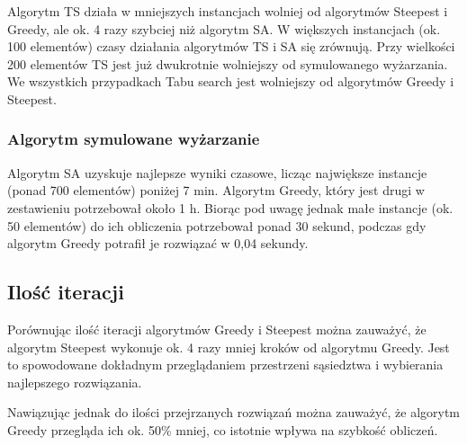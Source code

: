 Algorytm TS działa w mniejszych instancjach wolniej od algorytmów Steepest i Greedy, ale
ok. 4 razy szybciej niż algorytm SA. W większych instancjach (ok. 100 elementów) czasy 
działania algorytmów TS i SA się zrównują. Przy wielkości 200 elementów TS jest już 
dwukrotnie wolniejszy od symulowanego wyżarzania. We wszystkich przypadkach Tabu search 
jest wolniejszy od algorytmów Greedy i Steepest.

\subsubsection{Algorytm symulowane wyżarzanie}

Algorytm SA uzyskuje najlepsze wyniki czasowe, licząc największe instancje (ponad 700 
elementów) poniżej 7 min. Algorytm Greedy, który jest drugi w zestawieniu potrzebował 
około 1 h. Biorąc pod uwagę jednak małe instancje (ok. 50 elementów) do ich obliczenia 
potrzebował ponad 30 sekund, podczas gdy algorytm Greedy potrafił je rozwiązać w 0,04 
sekundy.

\subsection{Ilość iteracji}

Porównując ilość iteracji algorytmów Greedy i Steepest można zauważyć, że algorytm 
Steepest wykonuje ok. 4 razy mniej kroków od algorytmu Greedy. Jest to spowodowane 
dokładnym przeglądaniem przestrzeni sąsiedztwa i wybierania najlepszego rozwiązania.

Nawiązując jednak do ilości przejrzanych rozwiązań można zauważyć, że algorytm
Greedy przegląda ich ok. 50\% mniej, co istotnie wpływa na szybkość obliczeń.
